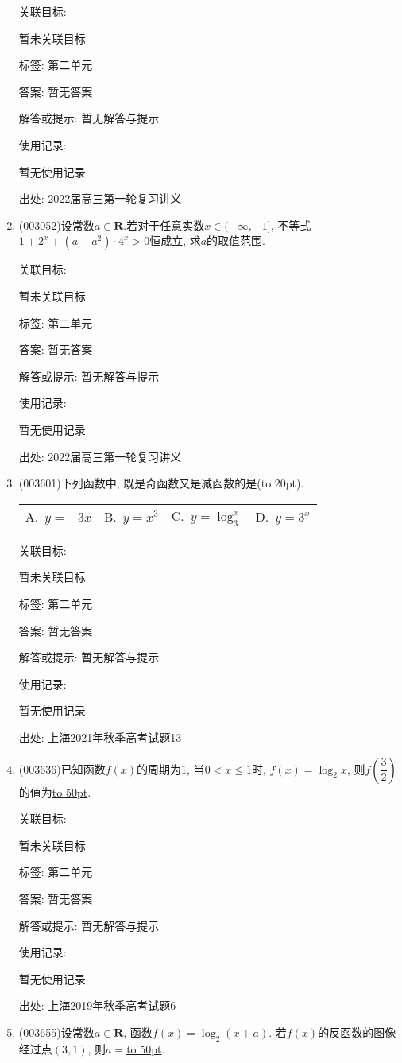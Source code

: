 \documentclass[10pt,a4paper]{article}
\newcommand{\blank}[1]{\underline{\hbox to #1pt{}}}
\newcommand{\bracket}[1]{(\hbox to #1pt{})}
\newcommand{\fourch}[4]{\par\begin{tabular}{p{.23\textwidth}p{.23\textwidth}p{.23\textwidth}p{.23\textwidth}}
A.~#1 &B.~#2& C.~#3& D.~#4
\end{tabular}}
\begin{document}
\begin{enumerate}[1.]
关联目标:

暂未关联目标



标签: 第二单元

答案: 暂无答案

解答或提示: 暂无解答与提示

使用记录:

暂无使用记录


出处: 2022届高三第一轮复习讲义
\item { (003052)}设常数$a\in \mathbf{R}$.若对于任意实数$x\in (-\infty ,-1]$, 不等式$1+2^x+(a-a^2)\cdot 4^x>0$恒成立, 求$a$的取值范围.


关联目标:

暂未关联目标



标签: 第二单元

答案: 暂无答案

解答或提示: 暂无解答与提示

使用记录:

暂无使用记录


出处: 2022届高三第一轮复习讲义
\item { (003601)}下列函数中, 既是奇函数又是减函数的是\bracket{20}.
\fourch{$y=-3x$}{$y=x^3$}{$y=\log_3^x$}{$y=3^x$}


关联目标:

暂未关联目标



标签: 第二单元

答案: 暂无答案

解答或提示: 暂无解答与提示

使用记录:

暂无使用记录


出处: 上海2021年秋季高考试题13
\item { (003636)}已知函数$f(x)$的周期为$1$, 当$0<x\le 1$时, $f(x)=\log_2 x$, 则$f\left(\dfrac{3}{2}\right)$的值为\blank{50}.


关联目标:

暂未关联目标



标签: 第二单元

答案: 暂无答案

解答或提示: 暂无解答与提示

使用记录:

暂无使用记录


出处: 上海2019年秋季高考试题6
\item { (003655)}设常数$a\in \mathbf{R}$, 函数$f(x)=\log_2(x+a)$. 若$f(x)$的反函数的图像经过点$(3,1)$, 则$a=$\blank{50}.



\end{enumerate}
\end{document}
